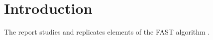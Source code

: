 \section{Introduction}
The report studies and replicates elements of the FAST algorithm \cite{yoon2015earthquake}. 